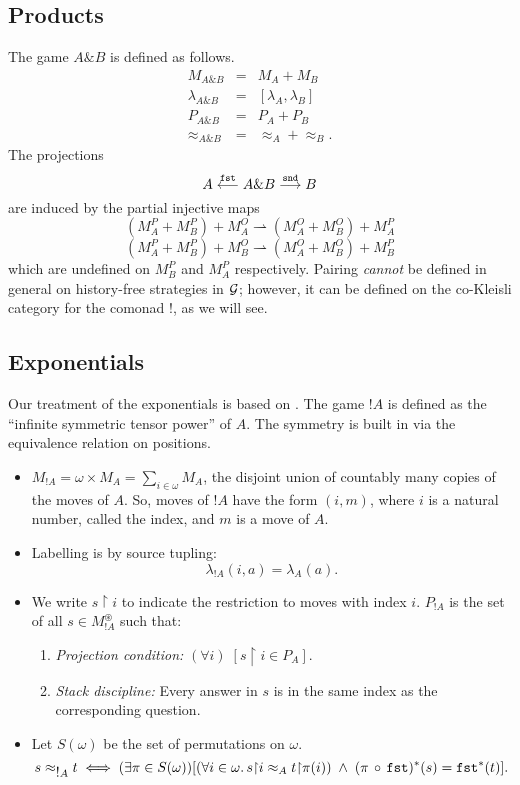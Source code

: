 \documentclass[11pt]{article}
\newcommand{\plays}[1]{M^{\circledast}_{#1}}
\newcommand{\Rest}{{\upharpoonright}}
\newcommand{\Pfr}{\rightharpoonup}
\newcommand{\Deq}{\approx}
\newcommand{\Sum}{\sum}
\newcommand{\ofcourse}{\mbox{$!$}}
\newcommand{\with}{\mbox{$\&$}}
\begin{document}
\subsection{Products}
The game $A \with B$ is defined as follows.
\begin{eqnarray*}
M_{A \with B} &=& M_A + M_B  \\
\lambda_{A \with B} &=& [\lambda_A,\lambda_B] \\
P_{A \with B}&=&  P_A + P_B  \\
\Deq_{A \with B}&=& \Deq_{A} + \Deq_{B} .
\end{eqnarray*}
The projections
\[ A \stackrel{\tt fst}{\longleftarrow} A \with B
\stackrel{\tt snd}{\longrightarrow}
B \]
are induced by the partial injective maps
\[ (M_{A}^{P} + M_{B}^{P}) + M_{A}^{O} \Pfr (M_{A}^{O} + M_{B}^{O}) + M_{A}^{P}
\]
\[ (M_{A}^{P} + M_{B}^{P}) + M_{B}^{O} \Pfr (M_{A}^{O} + M_{B}^{O}) +
M_{B}^{P}
\]
which are undefined on $M_{B}^{P}$ and $M_{A}^{P}$ respectively.
Pairing {\sl cannot} be defined in general on history-free strategies in
${\cal G}$;
however, it can be defined on the co-Kleisli category for the
comonad $\ofcourse $, as we will see.

\subsection{Exponentials}
Our treatment of the exponentials is based on \cite{AbramskyS:gamexp}.
The game $\ofcourse A$ is defined as the ``infinite symmetric tensor power''
of $A$.
The symmetry is built in via the equivalence relation on positions.

\begin{itemize}
\item $M_{\ofcourse A} =\omega\times M_A=\Sum_{i\in\omega} M_A $, the
  disjoint union of countably many copies of the moves of $A$.  So, moves
  of $\ofcourse A$ have the form $(i, m )$, where $i$ is a natural
  number, called the index, and $m$ is a move of $A$.
\item Labelling is by source tupling:
$$ \lambda_{\ofcourse A}(i, a) =  \lambda_A (a) . $$
\item We write $s\Rest i$ to indicate the restriction to moves with
  index $i$.  $P_{\ofcourse A}$ is the set of all
  $s \in \plays{\ofcourse A}$
such that:
\begin{enumerate}
\item {\em Projection condition:} $(\forall i) \; [s\Rest i \in P_A]$.
\item {\em Stack discipline:} Every answer in $s$ is in the same index as the
corresponding question.
\end{enumerate}
\item Let $S(\omega )$ be the set of permutations on $\omega$.
\[ s \Deq_{\ofcourse A} t \; \Longleftrightarrow \; ( \exists \pi \in
S(\omega ) )
[(\forall i \in \omega . \, s \Rest i \Deq_{A} t \Rest \pi (i) ) \;
\wedge \; (\pi \, \circ \, {\tt fst})^{\ast}(s) = {\tt fst}^{\ast}(t) ] .
\]

\end{itemize}
\end{document}
